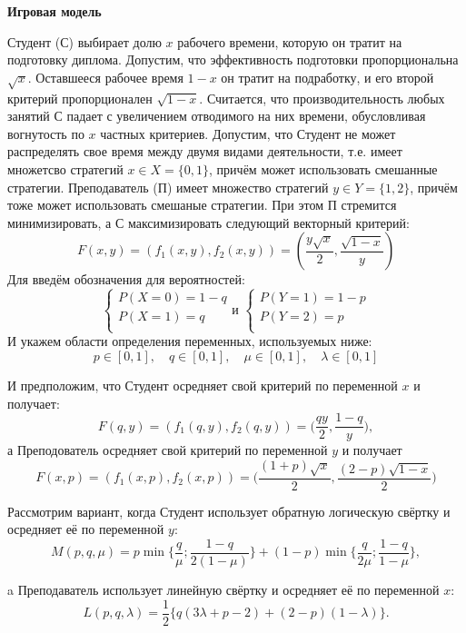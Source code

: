 \documentclass[letterpaper,12pt, reqno]{article}
\begin{document}
\begin{flushleft}
\textbf{Игровая модель}

Студент (С) выбирает долю $x$ рабочего времени, которую он тратит на подготовку диплома. Допустим, что эффективность подготовки пропорциональна $\sqrt{x}$. Оставшееся рабочее время $1-x$ он тратит на подработку, и его второй 
критерий пропорционален $\sqrt{1-x}$. Считается, что производительность любых занятий С падает с увеличением отводимого на них времени, обусловливая вогнутость по $x$ частных критериев. Допустим, что Студент не может распределять свое время между двумя 
видами деятельности, т.е. имеет множетсво стратегий $x\in X = \{0, 1\}$, причём может использовать смешанные стратегии.
Преподаватель (П) имеет множество стратегий $y \in Y=\{1, 2\}$, причём тоже может использовать смешаные стратегии.
При этом П стремится минимизировать, а С максимизировать следующий векторный критерий: 
\begin{equation}
F(x, y)=(f_1(x, y), f_2(x, y)) =(\frac{y \sqrt{x}}{2}, \frac{\sqrt{1-x}}{y})
\end{equation}
Для введём обозначения для вероятностей:
\[
\begin{cases}
P(X=0)=1-q \\
P(X=1)=q \\
\end{cases}
\textrm{и }
\begin{cases}
P(Y=1)=1-p \\
P(Y=2)=p \\
\end{cases}
\]
И укажем области определения переменных, используемых ниже:
\[
p \in [0, 1],\quad q \in [0, 1],\quad
\mu \in [0, 1],\quad \lambda \in [0, 1]
\]

И предположим, что Студент осредняет свой критерий по переменной $x$ и получает:
$$F(q, y)=(f_1(q, y), f_2(q, y)) =\big(\frac{q y}{2}, \frac{1-q}{y}\big),$$
а Преподователь осредняет свой критерий по переменной $y$ и получает
$$F(x, p)=(f_1(x, p), f_2(x, p)) =\big(\frac{(1+p)\sqrt{x}}{2}, \frac{(2-p)\sqrt{1-x}}{2}\big)$$

\vspace{5mm}

Рассмотрим вариант, когда Студент использует обратную логическую свёртку и осредняет её по переменной $y$:
\begin{equation} 
M(p,q,\mu)=p\min{\{\frac{q}{\mu};\frac{1-q}{2(1-\mu)}\}}+(1-p)\min\{\frac{q}{2\mu};\frac{1-q}{1-\mu}\},
\end{equation}

a Преподаватель использует линейную свёртку и осредняет её по переменной $x$:
\begin{equation} 
L(p,q,\lambda)=\frac{1}{2}\big \{q(3\lambda+p-2)+(2-p)(1-\lambda)\big \}.
\end{equation} 


\end{flushleft}
\end{document}

